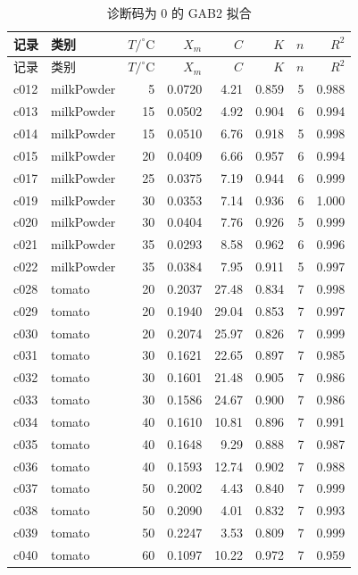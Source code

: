 \begin{longtable}{llrrrrrr}
\caption{诊断码为 0 的 GAB2 拟合}\\
\toprule
记录 & 类别 & $T/^\circ\mathrm{C}$ & $X_m$ & $C$ & $K$ & $n$ & $R^2$ \\
\midrule
\endfirsthead
\toprule
记录 & 类别 & $T/^\circ\mathrm{C}$ & $X_m$ & $C$ & $K$ & $n$ & $R^2$ \\
\midrule
\endhead
c012 & milkPowder & 5 & 0.0720 & 4.21 & 0.859 & 5 & 0.988 \\
c013 & milkPowder & 15 & 0.0502 & 4.92 & 0.904 & 6 & 0.994 \\
c014 & milkPowder & 15 & 0.0510 & 6.76 & 0.918 & 5 & 0.998 \\
c015 & milkPowder & 20 & 0.0409 & 6.66 & 0.957 & 6 & 0.994 \\
c017 & milkPowder & 25 & 0.0375 & 7.19 & 0.944 & 6 & 0.999 \\
c019 & milkPowder & 30 & 0.0353 & 7.14 & 0.936 & 6 & 1.000 \\
c020 & milkPowder & 30 & 0.0404 & 7.76 & 0.926 & 5 & 0.999 \\
c021 & milkPowder & 35 & 0.0293 & 8.58 & 0.962 & 6 & 0.996 \\
c022 & milkPowder & 35 & 0.0384 & 7.95 & 0.911 & 5 & 0.997 \\
c028 & tomato & 20 & 0.2037 & 27.48 & 0.834 & 7 & 0.998 \\
c029 & tomato & 20 & 0.1940 & 29.04 & 0.853 & 7 & 0.997 \\
c030 & tomato & 20 & 0.2074 & 25.97 & 0.826 & 7 & 0.999 \\
c031 & tomato & 30 & 0.1621 & 22.65 & 0.897 & 7 & 0.985 \\
c032 & tomato & 30 & 0.1601 & 21.48 & 0.905 & 7 & 0.986 \\
c033 & tomato & 30 & 0.1586 & 24.67 & 0.900 & 7 & 0.986 \\
c034 & tomato & 40 & 0.1610 & 10.81 & 0.896 & 7 & 0.991 \\
c035 & tomato & 40 & 0.1648 & 9.29 & 0.888 & 7 & 0.987 \\
c036 & tomato & 40 & 0.1593 & 12.74 & 0.902 & 7 & 0.988 \\
c037 & tomato & 50 & 0.2002 & 4.43 & 0.840 & 7 & 0.999 \\
c038 & tomato & 50 & 0.2090 & 4.01 & 0.832 & 7 & 0.993 \\
c039 & tomato & 50 & 0.2247 & 3.53 & 0.809 & 7 & 0.999 \\
c040 & tomato & 60 & 0.1097 & 10.22 & 0.972 & 7 & 0.959 \\

\end{longtable}
